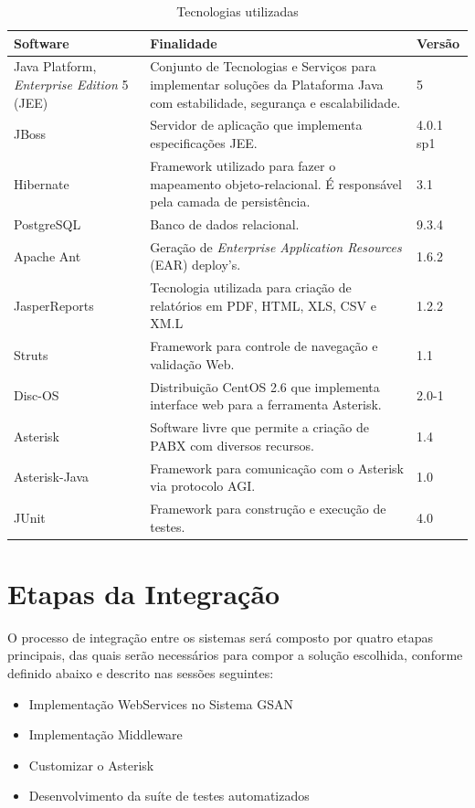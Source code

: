 \begin{table}[H]
	\center
	\footnotesize
	\caption{Tecnologias utilizadas}
	\label{tabela:tecnologiasUtilizadas}
	\begin{tabular}{|p{4cm}|p{7cm}|p{2cm}|}
		\hline
		\textbf{Software} & \textbf{Finalidade} & \textbf{Versão} \\
		\hline
		Java Platform, \textit{Enterprise Edition} 5 (JEE) & Conjunto de Tecnologias e Serviços para implementar soluções da Plataforma Java com estabilidade, segurança e escalabilidade. & 5 \\
		\hline
		JBoss 				& Servidor de aplicação que implementa especificações JEE. 								& 4.0.1 sp1 \\
		\hline
		Hibernate 			& Framework utilizado para fazer o mapeamento objeto-relacional. É responsável pela camada de persistência. & 3.1 \\
		\hline
		PostgreSQL 			& Banco de dados relacional. 															& 9.3.4 \\
		\hline
		Apache Ant 			& Geração de \textit{Enterprise Application Resources} (EAR) deploy’s. 					& 1.6.2 \\
		\hline
		JasperReports 		& Tecnologia utilizada para criação de relatórios em PDF, HTML, XLS, CSV e XM.L 		& 1.2.2 \\
		\hline
		Struts 				& Framework para controle de navegação e validação Web. 								& 1.1	 \\
		\hline
		Disc-OS 			& Distribuição CentOS 2.6 que implementa interface web para a ferramenta Asterisk. 		& 2.0-1 \\
		\hline
		Asterisk 			& Software livre que permite a criação de PABX com diversos recursos. 					& 1.4 \\		
		\hline
		Asterisk-Java 		& Framework para comunicação com o Asterisk via protocolo AGI. 							& 1.0 \\
		\hline
		JUnit		 		& Framework para construção e execução de testes. 										& 4.0 \\		
		\hline			
	\end{tabular}
\end{table}



\section{Etapas da Integração}
O processo de integração entre os sistemas será composto por quatro etapas principais, das quais serão necessários para compor a solução escolhida, conforme definido abaixo e descrito nas sessões seguintes:

\begin{itemize}
	\item Implementação WebServices no Sistema GSAN 
	\item Implementação Middleware
	\item Customizar o Asterisk	
	\item Desenvolvimento da suíte de testes automatizados
\end{itemize}

